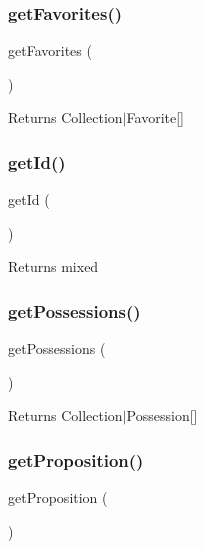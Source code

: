 \subsubsection{\texorpdfstring{getFavorites()}{getFavorites()}}
{\footnotesize\ttfamily get\+Favorites (\begin{DoxyParamCaption}{ }\end{DoxyParamCaption})}

\begin{DoxyReturn}{Returns}
Collection$\vert$\+Favorite\mbox{[}\mbox{]} 
\end{DoxyReturn}
\mbox{\label{class_app_1_1_entity_1_1_client_a12251d0c022e9e21c137a105ff683f13}} 
\subsubsection{\texorpdfstring{getId()}{getId()}}
{\footnotesize\ttfamily get\+Id (\begin{DoxyParamCaption}{ }\end{DoxyParamCaption})}

\begin{DoxyReturn}{Returns}
mixed 
\end{DoxyReturn}
\mbox{\label{class_app_1_1_entity_1_1_client_ac4cac51c734a24a84655cd6294ff4afb}} 
\subsubsection{\texorpdfstring{getPossessions()}{getPossessions()}}
{\footnotesize\ttfamily get\+Possessions (\begin{DoxyParamCaption}{ }\end{DoxyParamCaption})}

\begin{DoxyReturn}{Returns}
Collection$\vert$\+Possession\mbox{[}\mbox{]} 
\end{DoxyReturn}
\mbox{\label{class_app_1_1_entity_1_1_client_aa37187d64f069bb4138a898dc861dcc9}} 
\subsubsection{\texorpdfstring{getProposition()}{getProposition()}}
{\footnotesize\ttfamily get\+Proposition (\begin{DoxyParamCaption}{ }\end{DoxyParamCaption})}

